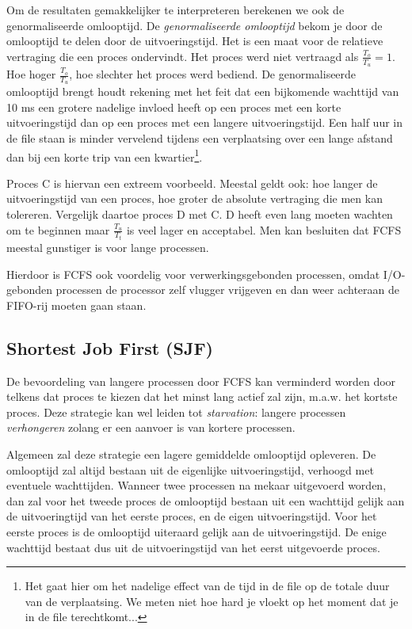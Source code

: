 Om de resultaten gemakkelijker te interpreteren berekenen we ook de
genormaliseerde omlooptijd. De \emph{genormaliseerde omlooptijd} bekom
je door de omlooptijd te delen door de uitvoeringstijd. Het is een maat
voor de relatieve vertraging die een proces ondervindt. Het proces
werd niet vertraagd als $\frac{T_o}{T_u} = 1$. Hoe hoger $\frac{T_o}{T_u}$, hoe
slechter het proces werd bediend. De genormaliseerde omlooptijd brengt houdt
rekening met het feit dat een bijkomende wachttijd van 10 ms een grotere
nadelige
invloed heeft op een proces met een korte uitvoeringstijd dan op een proces met
een langere uitvoeringstijd. Een half uur in de file staan is minder vervelend
tijdens een verplaatsing over een lange afstand dan bij een korte trip van een
kwartier\footnote{Het gaat hier om het nadelige effect van de tijd in de file
op de totale duur van de verplaatsing. We meten niet hoe hard je vloekt op het
moment dat je in de file terechtkomt...}.

Proces C is hiervan een extreem voorbeeld. Meestal geldt ook: hoe
langer de uitvoeringstijd van een proces, hoe groter de absolute
vertraging die men kan tolereren. Vergelijk daartoe proces D met C. D
heeft even lang moeten wachten om te beginnen maar
$\frac{T_u}{T_t}$ is veel lager en acceptabel. Men kan besluiten dat FCFS
meestal gunstiger is voor lange processen.

Hierdoor is FCFS ook voordelig voor verwerkingsgebonden
processen, omdat I/O-gebonden processen de processor zelf vlugger
vrijgeven en dan weer achteraan de FIFO-rij moeten gaan staan.

\subsection{Shortest Job First (SJF)}

De bevoordeling van langere processen door FCFS kan verminderd
worden door telkens dat proces te kiezen dat het minst lang actief zal
zijn, m.a.w. het kortste proces. Deze strategie kan wel leiden tot
\emph{starvation}: langere processen
\emph{verhongeren} zolang er een aanvoer is van
kortere processen.

Algemeen zal deze strategie een lagere gemiddelde omlooptijd
opleveren. De omlooptijd zal altijd bestaan uit de eigenlijke
uitvoeringstijd, verhoogd met eventuele wachttijden. Wanneer twee
processen na mekaar uitgevoerd worden, dan zal voor het tweede proces
de omlooptijd bestaan uit een wachttijd gelijk aan de uitvoeringtijd
van het eerste proces, en de eigen uitvoeringstijd. Voor het eerste
proces is de omlooptijd uiteraard gelijk aan de uitvoeringstijd. De
enige wachttijd bestaat dus uit de uitvoeringstijd van het eerst
uitgevoerde proces.

